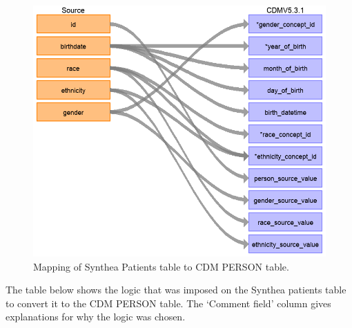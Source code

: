 \documentclass[11pt]{book}
\theoremstyle{definition}
\theoremstyle{definition}
\theoremstyle{definition}
\theoremstyle{remark}
\begin{document}
\begin{figure}
\includegraphics[width=1\linewidth]{images/ExtractTransformLoad/syntheaPersonTable} \caption{Mapping of Synthea Patients table to CDM PERSON table.}\label{fig:syntheaPerson}
\end{figure}

The table below shows the logic that was imposed on the Synthea patients table to convert it to the CDM PERSON table. The `Comment field' column gives explanations for why the logic was chosen.
\end{document}
